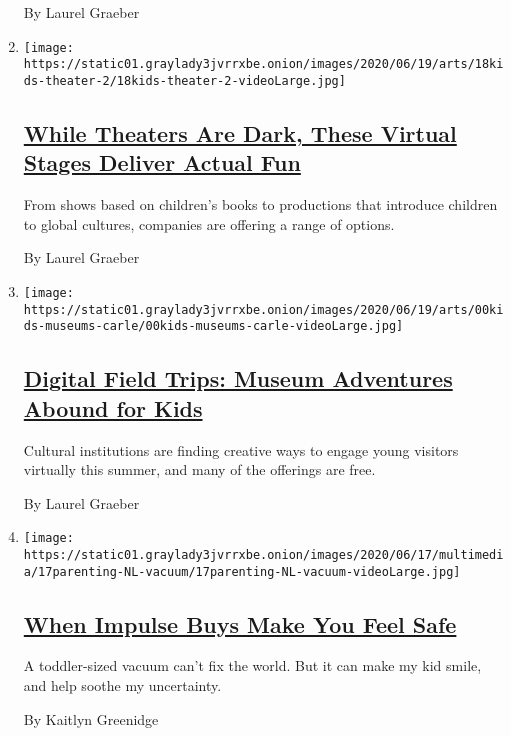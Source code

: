 \begin{enumerate}
  By Laurel Graeber
\item
  \texttt{[image: https://static01.graylady3jvrrxbe.onion/images/2020/06/19/arts/18kids-theater-2/18kids-theater-2-videoLarge.jpg]}

  \hypertarget{while-theaters-are-dark-these-virtual-stages-deliver-actual-fun}{%
  \subsection{\texorpdfstring{\href{/2020/06/18/theater/kids-summer-theater-virtual.html}{While
  Theaters Are Dark, These Virtual Stages Deliver Actual
  Fun}}{While Theaters Are Dark, These Virtual Stages Deliver Actual Fun}}\label{while-theaters-are-dark-these-virtual-stages-deliver-actual-fun}}

  From shows based on children's books to productions that introduce
  children to global cultures, companies are offering a range of
  options.

  By Laurel Graeber
\item
  \texttt{[image: https://static01.graylady3jvrrxbe.onion/images/2020/06/19/arts/00kids-museums-carle/00kids-museums-carle-videoLarge.jpg]}

  \hypertarget{digital-field-trips-museum-adventures-abound-for-kids}{%
  \subsection{\texorpdfstring{\href{/2020/06/18/arts/design/kids-museums-summer-virus.html}{Digital
  Field Trips: Museum Adventures Abound for
  Kids}}{Digital Field Trips: Museum Adventures Abound for Kids}}\label{digital-field-trips-museum-adventures-abound-for-kids}}

  Cultural institutions are finding creative ways to engage young
  visitors virtually this summer, and many of the offerings are free.

  By Laurel Graeber
\item
  \texttt{[image: https://static01.graylady3jvrrxbe.onion/images/2020/06/17/multimedia/17parenting-NL-vacuum/17parenting-NL-vacuum-videoLarge.jpg]}

  \hypertarget{when-impulse-buys-make-you-feel-safe}{%
  \subsection{\texorpdfstring{\href{/2020/06/17/parenting/virus-impulse-buys.html}{When
  Impulse Buys Make You Feel
  Safe}}{When Impulse Buys Make You Feel Safe}}\label{when-impulse-buys-make-you-feel-safe}}

  A toddler-sized vacuum can't fix the world. But it can make my kid
  smile, and help soothe my uncertainty.

  By Kaitlyn Greenidge
\end{enumerate}

